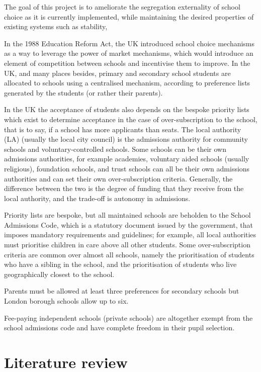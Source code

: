\documentclass{article}
\begin{document}
\begin{multicols}{2}
The goal of this project is to ameliorate the segregation externality of school choice as it is currently implemented, while maintaining the desired properties of existing systems such as stability, 

In the 1988 Education Reform Act, the UK introduced school choice mechanisms as a way to leverage the power of market mechanisms, which would introduce an element of competition between schools and incentivise them to improve. In the UK, and many places besides, primary and secondary school students are allocated to schools using a centralised mechanism, according to preference lists generated by the students (or rather their parents).

In the UK the acceptance of students also depends on the bespoke priority lists which exist to determine acceptance in the case of over-subscription to the school, that is to say, if a school has more applicants than seats. The local authority (LA) (usually the local city council) is the admissions authority for community schools and voluntary-controlled schools. Some schools can be their own admissions authorities, for example academies, voluntary aided schools (usually religious), foundation schools, and trust schools can all be their own admissions authorities and can set their own over-subscription criteria. Generally, the difference between the two is the degree of funding that they receive from the local authority, and the trade-off is autonomy in admissions.

Priority lists are bespoke, but all maintained schools are beholden to the School Admissions Code, which is a statutory document issued by the government, that imposes mandatory requirements and guidelines; for example, all local authorities must prioritise children in care above all other students. Some over-subscription criteria are common over almost all schools, namely the prioritisation of students who have a sibling in the school, and the prioritisation of students who live geographically closest to the school.

Parents must be allowed at least three preferences for secondary schools but London borough schools allow up to six. 

Fee-paying independent schools (private schools) are altogether exempt from the school admissions code and have complete freedom in their pupil selection.

\section{Literature review}

\end{multicols}
\end{document}
